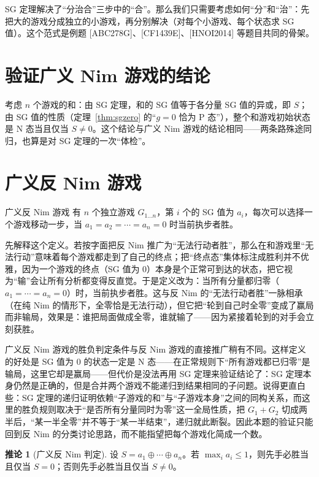 \documentclass[UTF8,a4paper,11pt,oneside,openany,fontset=fandol]{ctexbook}
\theoremstyle{definition}
\newtheorem{corollary}[definition]{推论}
\begin{document}
SG 定理解决了“分治合”三步中的“合”。那么我们只需要考虑如何“分”和“治”：先把大的游戏分成独立的小游戏，再分别解决（对每个小游戏、每个状态求 SG 值）。这个范式是例题 [ABC278G]、[CF1439E]、[HNOI2014] 等题目共同的骨架。

\section{验证广义 Nim 游戏的结论}
考虑 $n$ 个游戏的和：由 SG 定理，和的 SG 值等于各分量 SG 值的异或，即 $S$；由 SG 值的性质（定理~\ref{thm:sgzero} 的“$g=0$ 恰为 P 态”），整个和游戏初始状态是 N 态当且仅当 $S\ne0$。这个结论与广义 Nim 游戏的结论相同——两条路殊途同归，也算是对 SG 定理的一次“体检”。

\section{广义反 Nim 游戏}
\begin{problem}{广义反 Nim 游戏}
有 $n$ 个独立游戏 $G_{1\ldots n}$，第 $i$ 个的 SG 值为 $a_i$，每次可以选择一个游戏移动一步，当 $a_1=a_2=\cdots=a_n=0$ 时当前执步者胜。
\end{problem}

先解释这个定义。若按字面把反 Nim 推广为“无法行动者胜”，那么在和游戏里“无法行动”意味着每个游戏都走到了自己的终点；把“终点态”集体标注成胜利并不优雅，因为一个游戏的终点（SG 值为 $0$）本身是个正常可到达的状态，把它视为“输”会让所有分析都变得反直觉。于是定义改为：当所有分量都归零（$a_1=\cdots=a_n=0$）时，当前执步者胜。这与反 Nim 的“无法行动者胜”一脉相承（在纯 Nim 的情形下，全零恰是无法行动），但它把“轮到自己时全零”变成了赢局而非输局，效果是：谁把局面做成全零，谁就输了——因为紧接着轮到的对手会立刻获胜。

广义反 Nim 游戏的胜负判定条件与反 Nim 游戏的直接推广稍有不同。这样定义的好处是 SG 值为 $0$ 的状态一定是 N 态——在正常规则下“所有游戏都已归零”是输局，这里它却是赢局——但代价是没法再用 SG 定理来验证结论了：SG 定理本身仍然是正确的，但是合并两个游戏不能递归到结果相同的子问题。说得更直白些：SG 定理的递归证明依赖“子游戏的和”与“子游戏本身”之间的同构关系，而这里的胜负规则取决于“是否所有分量同时为零”这一全局性质，把 $G_1+G_2$ 切成两半后，“某一半全零”并不等于“某一半结束”，递归就此断裂。因此本题的验证只能回到反 Nim 的分类讨论思路，而不能指望把每个游戏化简成一个数。

\begin{corollary}[广义反 Nim 判定]
设 $S=a_1\oplus\cdots\oplus a_n$。若 $\max_i a_i\le1$，则先手必胜当且仅当 $S=0$；否则先手必胜当且仅当 $S\ne0$。
\end{corollary}
\end{document}
